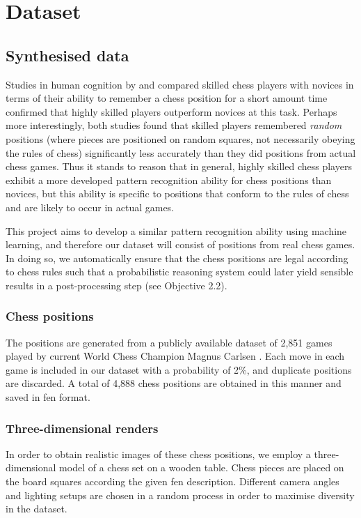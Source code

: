 \section{Dataset}
\label{sec:dataset}

\subsection{Synthesised data}
Studies in human cognition by \textcite{bilalic2010} and \textcite{zhou2018} compared skilled chess players with novices in terms of their ability to remember a chess position for a short amount time confirmed that highly skilled players outperform novices at this task.
Perhaps more interestingly, both studies found that skilled players remembered \emph{random} positions (where pieces are positioned on random squares, not necessarily obeying the rules of chess) significantly less accurately than they did positions from actual chess games. 
Thus it stands to reason that in general, highly skilled chess players exhibit a more developed pattern recognition ability for chess positions than novices, but this ability is specific to positions that conform to the rules of chess and are likely to occur in actual games.

This project aims to develop a similar pattern recognition ability using machine learning, and therefore our dataset will consist of positions from real chess games. 
In doing so, we automatically ensure that the chess positions are legal according to chess rules such that a probabilistic reasoning system could later yield sensible results in a post-processing step (see Objective 2.2).

\subsubsection{Chess positions}
The positions are generated from a publicly available dataset of 2,851 games played by current World Chess Champion Magnus Carlsen \cite{64squares2020}.
Each move in each game is included in our dataset with a probability of 2\%, and duplicate positions are discarded.
A total of 4,888 chess positions are obtained in this manner and saved in \gls{fen} format.

\subsubsection{Three-dimensional renders}
In order to obtain realistic images of these chess positions, we employ a three-dimensional model of a chess set on a wooden table. 
Chess pieces are placed on the board squares according the given \gls{fen} description. 
Different camera angles and lighting setups are chosen in a random process in order to maximise diversity in the dataset.

